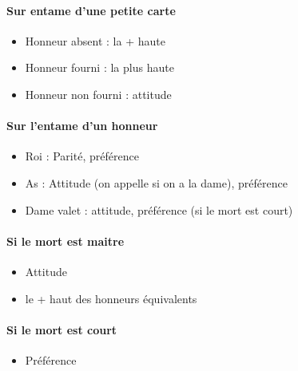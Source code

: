 \documentclass[a4paper]{article}
\begin{document}
\paragraph{Sur entame d’une petite carte}

\begin{itemize}
\item Honneur absent : la + haute

\item Honneur fourni : la plus haute

\item Honneur non fourni : attitude

\end{itemize}

\paragraph{Sur l’entame d’un honneur}

\begin{itemize}
\item Roi : Parité, préférence

\item As : Attitude (on appelle si on a la dame), préférence

\item Dame valet : attitude, préférence (si le mort est court)

\end{itemize}

\paragraph{Si le mort est maitre}

\begin{itemize}
\item Attitude

\item le + haut des honneurs équivalents

\end{itemize}

\paragraph{Si le mort est court}

\begin{itemize}
\item Préférence

\end{itemize}
\end{document}
